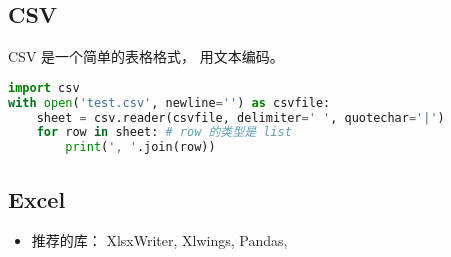 
\begin{issues}
\issueDraft
\end{issues}

\subsection{CSV}
CSV 是一个简单的表格格式， 用文本编码。
\begin{lstlisting}[language=python]
import csv
with open('test.csv', newline='') as csvfile:
    sheet = csv.reader(csvfile, delimiter=' ', quotechar='|')
    for row in sheet: # row 的类型是 list
        print(', '.join(row))
\end{lstlisting}

\subsection{Excel}
\begin{itemize}
\item 推荐的库： XlsxWriter, Xlwings, Pandas, 
\end{itemize}
